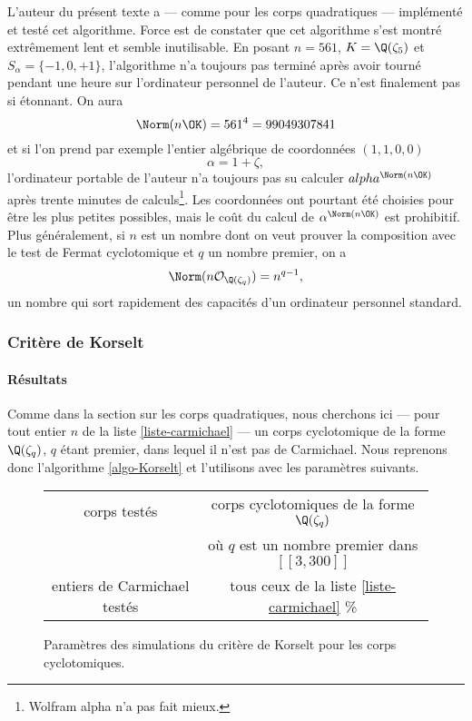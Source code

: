 L'auteur du présent texte a — comme pour les corps quadratiques — implémenté et testé cet algorithme. Force est de constater que cet algorithme s'est montré extrêmement lent et semble inutilisable. En posant $n=561$, $K = \Q(\zeta_5)$ et $S_\alpha = \{-1, 0, +1\}$, l'algorithme n'a toujours pas terminé après avoir tourné pendant une heure sur l'ordinateur personnel de l'auteur. Ce n'est finalement pas si étonnant. On aura \[\Norm(n\OK) = 561^4 = 99049307841\] et si l'on prend par exemple l'entier algébrique de coordonnées $(1, 1, 0, 0)$ \[\alpha =1 + \zeta,\] l'ordinateur portable de l'auteur n'a toujours pas su calculer $alpha^{\Norm(n\OK)}$ après trente minutes de calculs\footnote{Wolfram alpha n'a pas fait mieux.}. Les coordonnées ont pourtant été choisies pour être les plus petites possibles, mais le coût du calcul de $\alpha^{\Norm(n\OK)}$ est prohibitif. Plus généralement, si $n$ est un nombre dont on veut prouver la composition avec le test de Fermat cyclotomique et $q$ un nombre premier, on a \[\Norm(n\mathcal{O}_{\Q(\zeta_q)}) = n^{q-1},\] un nombre qui sort rapidement des capacités d'un ordinateur personnel standard. 
\subsubsection{Critère de Korselt}

\paragraph{Résultats}

Comme dans la section sur les corps quadratiques, nous cherchons ici — pour tout entier $n$ de la liste \ref{liste-carmichael} — un corps cyclotomique de la forme $\Q(\zeta_q)$, $q$ étant premier, dans lequel il n'est pas de Carmichael. Nous reprenons donc l'algorithme \ref{algo-Korselt} et l'utilisons avec les paramètres suivants.

\begin{figure}[h!]\label{param-korselt-cyclo}
	\begin{center}
		\begin{tabular}{|c|c|}
			\hline
			corps testés & corps cyclotomiques de la forme $\Q(\zeta_q)$ \\ & où $q$ est un nombre premier dans $[\![3, 300]\!]$ \\\hline
			entiers de Carmichael testés & tous ceux de la liste \ref{liste-carmichael} \% \\\hline
		\end{tabular}
		\caption{Paramètres des simulations du critère de Korselt pour les corps cyclotomiques.}
	\end{center}
\end{figure}


